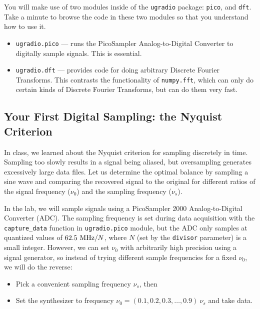 \documentclass[11pt,preprint]{aastex}
\begin{document}
You will make use of two modules inside of the {\tt ugradio} package: {\tt pico}, and {\tt dft}.
Take a minute to browse the code in these two modules so that you understand how to use it.

\begin{itemize}

\item {\tt ugradio.pico} --- runs the PicoSampler Analog-to-Digital Converter to digitally sample signals. This is essential.

\item {\tt ugradio.dft} --- provides code for doing arbitrary Discrete Fourier Transforms.  This
contrasts the functionality of {\tt numpy.fft}, which can only do certain kinds of
Discrete Fourier Transforms, but can do them very fast.



\end{itemize}


\subsection{Your First Digital Sampling: the Nyquist Criterion}

\noindent
In class, we learned about the 
Nyquist criterion for sampling discretely in time. 
Sampling too slowly results in a signal being aliased, but oversampling
generates excessively large data files.
Let us determine the optimal balance by sampling a sine wave
and comparing the recovered signal
to the original for different ratios of the signal frequency ($\nu_0$) and the
sampling frequency ($\nu_s$).

In the lab, we will sample signals using a PicoSampler 2000 Analog-to-Digital Converter (ADC).
The sampling frequency is set during data acquisition with the {\tt capture\_data} function
in {\tt ugradio.pico} module, but the ADC only samples at
quantized values of $62.5~{\rm MHz} / N$, where $N$ (set by the {\tt divisor} parameter)
is a small integer. However, we can set
$\nu_0$ with arbitrarily high precision using a signal generator, so instead of trying
different sample frequencies for a fixed $\nu_0$, we will do the reverse:
\begin{itemize} 
	\item Pick a convenient sampling frequency $\nu_s$, then
	\item Set the synthesizer to frequency $\nu_0 = (0.1, 0.2,
	  0.3, \dots, 0.9)~\nu_s$ and take data. 
\end{itemize}
\end{document}
